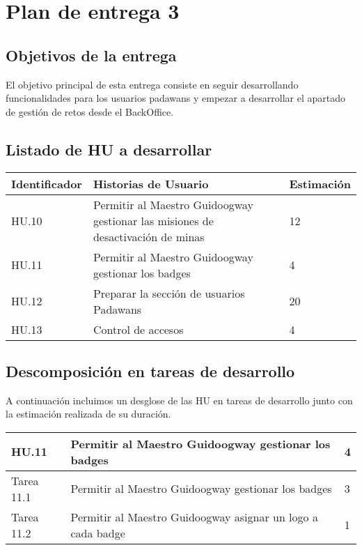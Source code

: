 \section{Plan de entrega 3}

\subsection{Objetivos de la entrega}

El objetivo principal de esta entrega consiste en seguir desarrollando funcionalidades para los usuarios padawans y empezar a desarrollar el apartado de gestión de retos desde el BackOffice.

\subsection{Listado de HU a desarrollar}

\begin{table}[h]
	\centering
	\begin{tabular}{| p{2.3cm} | p{6.7cm} | p{2cm} |}
		\rowcolor[HTML]{329A9D} 
		{\color[HTML]{FFFFFF} \textbf{Identificador}} & {\color[HTML]{FFFFFF} \textbf{Historias de Usuario}} & {\color[HTML]{FFFFFF} \textbf{Estimación}}  \\ \hline
		HU.10 & Permitir al Maestro Guidoogway gestionar las misiones de desactivación de minas & 12 \\ \hline
		HU.11 & Permitir al Maestro Guidoogway gestionar los badges & 4 \\ \hline
		HU.12 & Preparar la sección de usuarios Padawans & 20 \\ \hline
		HU.13 & Control de accesos & 4 \\ \hline
	\end{tabular}
\end{table}

\subsection{Descomposición en tareas de desarrollo}

A continuación incluimos un desglose de las HU en tareas de desarrollo junto con la estimación realizada de su duración.\\

\begin{table}[h]
	\centering
	\begin{tabular}{| p{2.3cm} | p{6.7cm} | p{2cm} |}
		\rowcolor[HTML]{329A9D} 
		{\color[HTML]{FFFFFF} \textbf{HU.11}} & {\color[HTML]{FFFFFF} \textbf{Permitir al Maestro Guidoogway gestionar los badges}} & {\color[HTML]{FFFFFF} \textbf{4}}  \\ \hline
		Tarea 11.1 & Permitir al Maestro Guidoogway gestionar los badges & 3 \\ \hline
		Tarea 11.2 & Permitir al Maestro Guidoogway asignar un logo a cada badge  & 1 \\ \hline
	\end{tabular}
\end{table}


